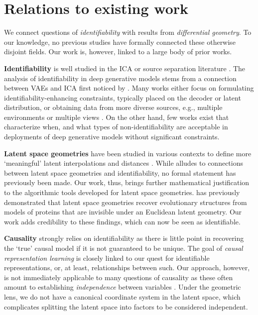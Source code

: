 \section{Relations to existing work}
\label{sec:related_work}

We connect questions of \emph{identifiability} with results from \emph{differential geometry}. To our knowledge, no previous studies have formally connected these otherwise disjoint fields. Our work is, however, linked to a large body of prior works.

\textbf{Identifiability} is well studied in the ICA or source separation literature \citep{ICA1, ICA2}. The analysis of identifiability in deep generative models stems from a connection between VAEs and ICA first noticed by \citet{khemakhem2020variationalautoencodersnonlinearica}. Many works either focus on formulating identifiability-enhancing constraints, typically placed on the decoder or latent distribution, or obtaining data from more diverse sources, e.g., multiple environments or multiple views \citep{kivva2022identifiabilitydeepgenerativemodels,hyvarinen2019nonlinearicausingauxiliary, gresele2019incompleterosettastoneproblem, pmlr-v119-locatello20a, locatello2019disentangling, shu2019weakly}. On the other hand, few works exist that characterize when, and what types of non-identifiability are acceptable in deployments of deep generative models without significant constraints.

\textbf{Latent space geometries} have been studied in various contexts to define more `meaningful' latent interpolations and distances \citep{Tosi:UAI:2014, arvanitidis2021latentspaceodditycurvature, hadi:rss:2021}. While \citet{hauberg:only:2018} alludes to connections between latent space geometries and identifiability, no formal statement has previously been made. Our work, thus, brings further mathematical justification to the algorithmic tools developed for latent space geometries. \citet{Detlefsen_2022} has previously demonstrated that latent space geometries recover evolutionary structures from models of proteins that are invisible under an Euclidean latent geometry. Our work adds credibility to these findings, which can now be seen as identifiable.

\textbf{Causality} strongly relies on identifiability as there is little point in recovering the `true' causal model if it is not guaranteed to be unique. The goal of \emph{causal representation learning} \citep{scholkopf2021toward} is closely linked to our quest for identifiable representations, or, at least, relationships between such. Our approach, however, is not immediately applicable to many questions of causality as these often amount to establishing \emph{independence} between variables \citep{peters2017elements}. Under the geometric lens, we do not have a canonical coordinate system in the latent space, which complicates splitting the latent space into factors to be considered independent.

